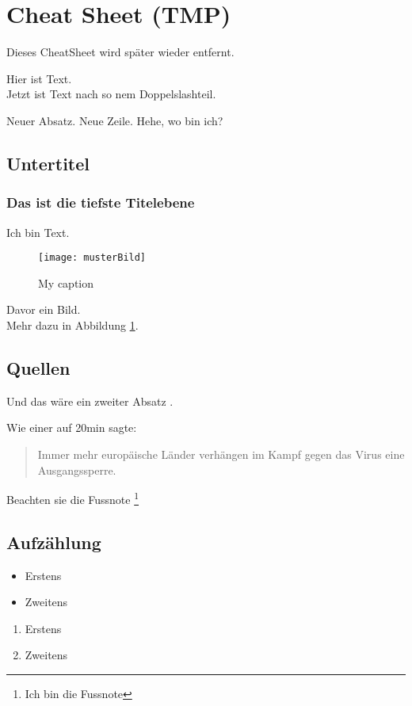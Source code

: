 \section{Cheat Sheet (TMP)}
Dieses CheatSheet wird später wieder entfernt.

Hier ist Text. \\

Jetzt ist Text nach so nem Doppelslashteil.

Neuer Absatz. \linebreak
Neue Zeile. \bigskip
Hehe, wo bin ich?

\subsection{Untertitel}
\subsubsection{Das ist die tiefste Titelebene}
Ich bin Text.
\begin{figure}[H]
    \centering
    \texttt{[image: musterBild]}
    \caption{My caption}
    \label{fig:bsp}
\end{figure}
Davor ein Bild. \\
Mehr dazu in Abbildung \ref{fig:bsp}.

\subsection{Quellen}
Und das wäre ein zweiter Absatz \cite{ba}.

Wie einer auf 20min sagte:\cite{dev}
\begin{quote}
Immer mehr europäische Länder verhängen im Kampf gegen das Virus eine Ausgangssperre.
\end{quote}

Beachten sie die Fussnote \footnote{Ich bin die Fussnote}

\subsection{Aufzählung}
\begin{itemize}
    \item Erstens
    \item Zweitens
\end{itemize}

\begin{enumerate}
    \item Erstens
    \item Zweitens
\end{enumerate}


